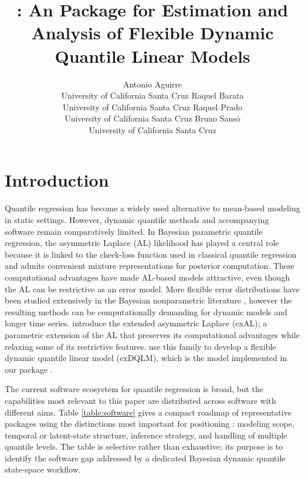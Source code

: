 \documentclass[jss]{jss}
\author{Antonio Aguirre \\ University of California Santa Cruz \And
        Raquel Barata \\ University of California Santa Cruz \AND
        Raquel Prado \\ University of California Santa Cruz \And
        Bruno Sans\'{o} \\ University of California Santa Cruz}
\title{\pkg{exdqlm}: An \proglang{R} Package for Estimation and Analysis of Flexible Dynamic Quantile Linear Models}
\begin{document}
\section{Introduction}

Quantile regression has become a widely used alternative to mean-based modeling in static settings. However, dynamic quantile methods and accompanying software remain comparatively limited. In Bayesian parametric quantile regression, the asymmetric Laplace (AL) likelihood has played a central role because it is linked to the check-loss function used in classical quantile regression \citep{yu2001bayesian,koenkerquantile} and admits convenient mixture representations for posterior computation. These computational advantages have made AL-based models attractive, even though the AL can be restrictive as an error model. More flexible error distributions have been studied extensively in the Bayesian nonparametric literature \citep{kottas2009bayesian,reich2009flexible,taddy2010bayesian}, however the resulting methods can be computationally demanding for dynamic models and longer time series. \cite{yan2025family} introduce the extended asymmetric Laplace (exAL); a parametric extension of the AL that preserves its computational advantages while relaxing some of its restrictive features. \cite{me} use this family to develop a flexible dynamic quantile linear model (exDQLM), which is the model implemented in our  package .

The current  software ecosystem for quantile regression is broad, but the capabilities most relevant to this paper are distributed across software with different aims. Table \ref{table:software} gives a compact roadmap of representative packages using the distinctions most important for positioning : modeling scope, temporal or latent-state structure, inference strategy, and handling of multiple quantile levels. The table is selective rather than exhaustive; its purpose is to identify the software gap addressed by a dedicated Bayesian dynamic quantile state-space workflow.
\end{document}
